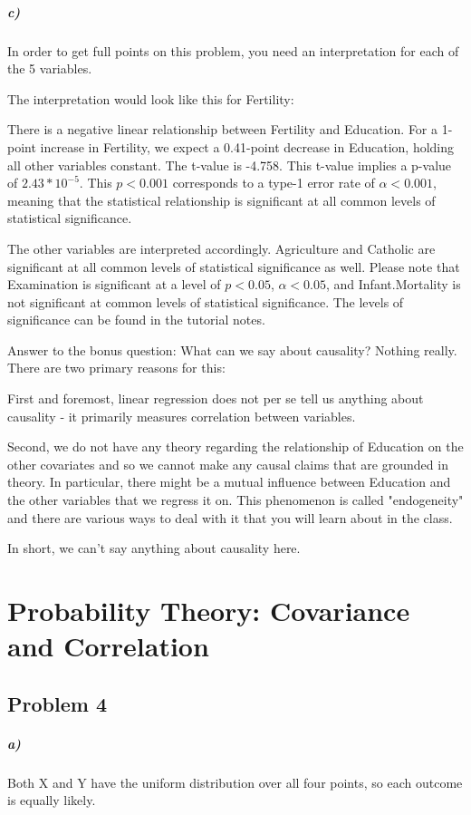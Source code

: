 \documentclass[12pt,letter]{article}\usepackage[]{graphicx}\usepackage[]{color}
\begin{document}
\subparagraph{c)} In order to get full points on this problem, you need an interpretation for each of the 5 variables.

The interpretation would look like this for Fertility:

There is a negative linear relationship between Fertility and Education. For a 1-point increase in Fertility, we expect a 0.41-point decrease in Education, holding all other variables constant. The t-value is -4.758. This t-value implies a p-value of $2.43*10^{-5}$. This $p < 0.001$ corresponds to a type-1 error rate of $\alpha < 0.001$, meaning that the statistical relationship is significant at all common levels of statistical significance.

The other variables are interpreted accordingly. Agriculture and Catholic are significant at all common levels of statistical significance as well. Please note that Examination is significant at a level of $p < 0.05$, $\alpha < 0.05$, and Infant.Mortality is not significant at common levels of statistical significance. The levels of significance can be found in the tutorial notes.

Answer to the bonus question: What can we say about causality? Nothing really. There are two primary reasons for this:

First and foremost, linear regression does not per se tell us anything about causality - it primarily measures correlation between variables.

Second, we do not have any theory regarding the relationship of Education on the other covariates and so we cannot make any causal claims that are grounded in theory. In particular, there might be a mutual influence between Education and the other variables that we regress it on. This phenomenon is called "endogeneity" and there are various ways to deal with it that you will learn about in the class.

In short, we can't say anything about causality here.



\section*{Probability Theory: Covariance and Correlation}

\subsection*{Problem 4}

\subparagraph{a)} Both X and Y have the uniform distribution over all four points, so each outcome is equally likely.
\end{document}

